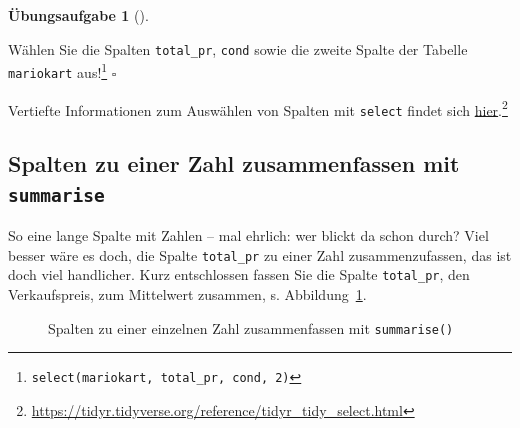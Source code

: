 \documentclass[
  letterpaper,
]{scrbook}
\theoremstyle{definition}
\theoremstyle{definition}
\theoremstyle{definition}
\newtheorem{exercise}{Übungsaufgabe}[chapter]
\theoremstyle{remark}
\begin{document}
\begin{exercise}[]\protect\hypertarget{exr-select}{}\label{exr-select}

Wählen Sie die Spalten \texttt{total\_pr}, \texttt{cond} sowie die
zweite Spalte der Tabelle \texttt{mariokart} aus!\footnote{\texttt{select(mariokart,\ total\_pr,\ cond,\ 2)}}
\(\square\)

\end{exercise}

Vertiefte Informationen zum Auswählen von Spalten mit \texttt{select}
findet sich
\href{https://tidyr.tidyverse.org/reference/tidyr_tidy_select.html}{hier}.\footnote{\url{https://tidyr.tidyverse.org/reference/tidyr_tidy_select.html}}

\subsection{\texorpdfstring{Spalten zu einer Zahl zusammenfassen mit
\texttt{summarise}}{Spalten zu einer Zahl zusammenfassen mit summarise}}\label{spalten-zu-einer-zahl-zusammenfassen-mit-summarise}

So eine lange Spalte mit Zahlen -- mal ehrlich: wer blickt da schon
durch? Viel besser wäre es doch, die Spalte \texttt{total\_pr} zu einer
Zahl zusammenzufassen, das ist doch viel handlicher. Kurz entschlossen
fassen Sie die Spalte \texttt{total\_pr}, den Verkaufspreis, zum
Mittelwert zusammen, s. Abbildung~\ref{fig-summarise}.

\begin{figure}


\caption{\label{fig-summarise}Spalten zu einer einzelnen Zahl
zusammenfassen mit \texttt{summarise()}}

\end{figure}%
\end{document}
